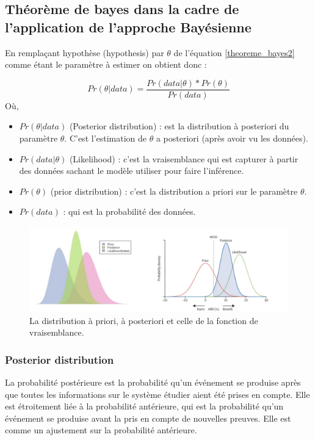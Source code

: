 \subsection{Théorème de bayes dans la cadre de l’application de l’approche Bayésienne}
En remplaçant hypothèse (hypothesis) par \(\displaystyle \theta \) de l’équation \ref{theoreme_bayes2} comme étant le paramètre à estimer on obtient donc :

\begin{equation}
	Pr(\theta|data) = \frac{Pr(data|\theta)*Pr(\theta)}{Pr(data)}
	\label{theoreme_bayes3}
\end{equation}
Où,
\begin{itemize}
    \item \(\displaystyle Pr(\theta|data) \) (Posterior distribution) : est la distribution à posteriori du paramètre \(\displaystyle \theta \). C’est l’estimation de \(\displaystyle \theta \) a posteriori (après avoir vu les données).
    \item \(\displaystyle Pr(data|\theta) \) (Likelihood) : c’est la vraisemblance qui est capturer à partir des données sachant le modèle utiliser pour faire l’inférence.
    \item \(\displaystyle Pr(\theta) \) (prior distribution) : c’est la distribution a priori sur le paramètre \(\displaystyle \theta \). 
    \item \(\displaystyle Pr(data) \) : qui est la probabilité des données.
\end{itemize}


\begin{figure}[H]
	\begin{center}
		\includegraphics[width=\textwidth]{images/chapitre5/prior_likelihood_posterior.png}
	\end{center}
	\caption{La distribution à priori, à posteriori et celle de la fonction de vraisemblance.}
	\label{prior_likelihood_posterior}
\end{figure}

\subsubsection{Posterior distribution}
La probabilité postérieure est la probabilité qu'un événement se produise après que toutes les informations sur le système étudier aient été prises en compte. Elle est étroitement liée à la probabilité antérieure, qui est la probabilité qu'un événement se produise avant la pris en compte de nouvelles preuves. Elle est comme un ajustement sur la probabilité antérieure.

